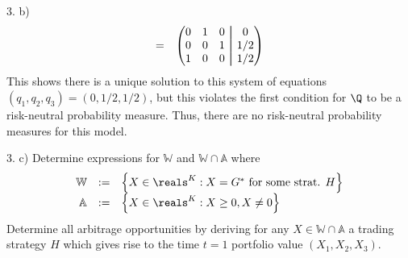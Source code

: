 \documentclass[11pt,a4paper]{article}
\newcommand\aug{\fboxsep=-\fboxrule\!\!\!\fbox{\strut}\!\!\!}
\begin{document}
\begin{answer}{3. b)}
\[\begin{array}{rl}
    =&\begin{pmatrix}
        0&1&0&\aug&0\\
        0&0&1&\aug&1/2\\
        1&0&0&\aug&1/2
    \end{pmatrix}\\
  \end{array}\]
  This shows there is a unique solution to this system of equations $(q_1,q_2,q_3)=(0,1/2,1/2)$, but this violates the first condition for $\Q$ to be a risk-neutral probability measure. Thus, there are no risk-neutral probability measures for this model.
\end{answer}

\begin{question}{3. c)}
  Determine expressions for $\mathbb{W}$ and $\mathbb{W}\cap\mathbb{A}$ where
  \[\begin{array}{rcl}
    \mathbb{W}&:=&\left\{X\in\reals^K:X=G^*\text{ for some strat. }H\right\}\\
    \mathbb{A}&:=&\left\{X\in\reals^K:X\geq0,X\neq0\right\}
  \end{array}\]
  Determine all arbitrage opportunities by deriving for any $X\in\mathbb{W}\cap\mathbb{A}$ a trading strategy $H$ which gives rise to the time $t=1$ portfolio value $(X_1,X_2,X_3)$.
\end{question}
\end{document}
